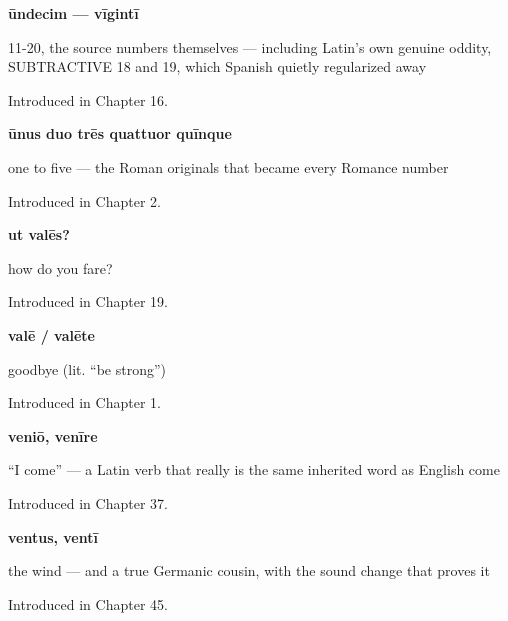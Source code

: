 \noindent\begin{minipage}[t]{\linewidth}
\raggedright
\textbf{ūndecim — vīgintī}\par
\small 11-20, the source numbers themselves — including Latin's own genuine oddity, SUBTRACTIVE 18 and 19, which Spanish quietly regularized away\par
\footnotesize Introduced in Chapter 16.
\end{minipage}\par\medskip

\noindent\begin{minipage}[t]{\linewidth}
\raggedright
\textbf{ūnus duo trēs quattuor quīnque}\par
\small one to five — the Roman originals that became every Romance number\par
\footnotesize Introduced in Chapter 2.
\end{minipage}\par\medskip

\noindent\begin{minipage}[t]{\linewidth}
\raggedright
\textbf{ut valēs?}\par
\small how do you fare?\par
\footnotesize Introduced in Chapter 19.
\end{minipage}\par\medskip

\noindent\begin{minipage}[t]{\linewidth}
\raggedright
\textbf{valē / valēte}\par
\small goodbye (lit. \textquotedblleft{}be strong\textquotedblright{})\par
\footnotesize Introduced in Chapter 1.
\end{minipage}\par\medskip

\noindent\begin{minipage}[t]{\linewidth}
\raggedright
\textbf{veniō, venīre}\par
\small \textquotedblleft{}I come\textquotedblright{} — a Latin verb that really is the same inherited word as English come\par
\footnotesize Introduced in Chapter 37.
\end{minipage}\par\medskip

\noindent\begin{minipage}[t]{\linewidth}
\raggedright
\textbf{ventus, ventī}\par
\small the wind — and a true Germanic cousin, with the sound change that proves it\par
\footnotesize Introduced in Chapter 45.
\end{minipage}\par\medskip

